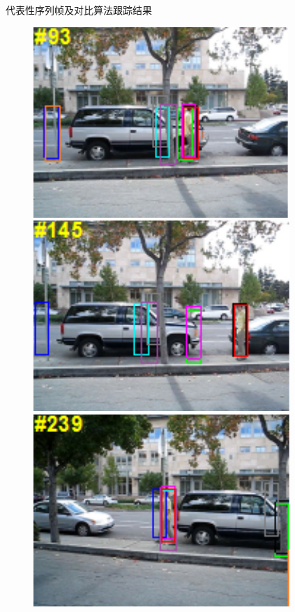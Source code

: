 \begin{frame}{代表性序列帧及对比算法跟踪结果}
\begin{figure}[htp]
\includegraphics[width=0.31\textheight,height=0.25\textheight]{figures/Figure2b1.pdf}
\includegraphics[width=0.31\textheight,height=0.25\textheight]{figures/Figure2b2.pdf}
\includegraphics[width=0.31\textheight,height=0.25\textheight]{figures/Figure2b3.pdf}\\


\end{figure}
\end{frame}
